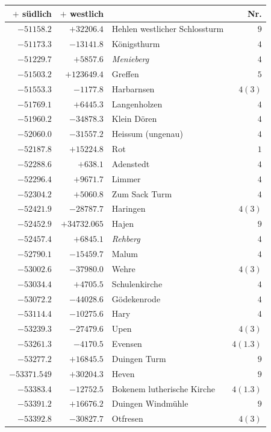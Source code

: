 \begin{center}\begingroup\fontsize{8}{9}\selectfont
\setlength{\tabcolsep}{4pt}
\begin{tabular}{r|r|p{170pt}|r}\hline
\(+\) südlich&\(+\) westlich&&Nr.\\\hline
\(-51158.2\)&\(+32206.4\)&Hehlen westlicher Schlossturm&\(9\)\\
\(-51173.3\)&\(-13141.8\)&Königsthurm&\(4\)\\
\(-51229.7\)&\(+5857.6\)&\textit{Menieberg}&\(4\)\\
\(-51503.2\)&\(+123649.4\)&Greffen&\(5\)\\
\(-51553.3\)&\(-1177.8\)&Harbarnsen&\(4(3)\)\\
\(-51769.1\)&\(+6445.3\)&Langenholzen&\(4\)\\
\(-51960.2\)&\(-34878.3\)&Klein Dören&\(4\)\\
\(-52060.0\)&\(-31557.2\)&Heissum (ungenau)&\(4\)\\
\(-52187.8\)&\(+15224.8\)&Rot&\(1\)\\
\(-52288.6\)&\(+638.1\)&Adenstedt&\(4\)\\
\(-52296.4\)&\(+9671.7\)&Limmer&\(4\)\\
\(-52304.2\)&\(+5060.8\)&Zum Sack Turm&\(4\)\\
\(-52421.9\)&\(-28787.7\)&Haringen&\(4(3)\)\\
\(-52452.9\)&\(+34732.065\)&Hajen&\(9\)\\
\(-52457.4\)&\(+6845.1\)&\textit{Rehberg}&\(4\)\\
\(-52790.1\)&\(-15459.7\)&Malum&\(4\)\\
\(-53002.6\)&\(-37980.0\)&Wehre&\(4(3)\)\\
\(-53034.4\)&\(+4705.5\)&Schulenkirche&\(4\)\\
\(-53072.2\)&\(-44028.6\)&Gödekenrode&\(4\)\\
\(-53114.4\)&\(-10275.6\)&Hary&\(4\)\\
\(-53239.3\)&\(-27479.6\)&Upen&\(4(3)\)\\
\(-53261.3\)&\(-4170.5\)&Evensen&\(4(1.3)\)\\
\(-53277.2\)&\(+16845.5\)&Duingen Turm&\(9\)\\
\(-53371.549\)&\(+30204.3\)&Heven&\(9\)\\
\(-53383.4\)&\(-12752.5\)&Bokenem lutherische Kirche&\(4(1.3)\)\\
\(-53391.2\)&\(+16676.2\)&Duingen Windmühle&\(9\)\\
\(-53392.8\)&\(-30827.7\)&Otfresen&\(4(3)\)\\

\end{tabular}
\end{center}
